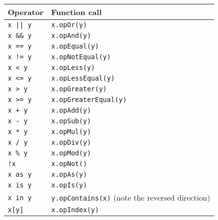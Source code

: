 \begin{longtable}{ | l | X | }
\hline
\textbf{Operator} & \textbf{Function call} \\
\hline\hline
\texttt{x || y} & \texttt{x.opOr(y)} \\
\hline
\texttt{x \&\& y} & \texttt{x.opAnd(y)} \\
\hline
\texttt{x == y} & \texttt{x.opEqual(y)} \\
\hline
\texttt{x != y} & \texttt{x.opNotEqual(y)} \\
\hline
\texttt{x < y} & \texttt{x.opLess(y)} \\
\hline
\texttt{x <= y} & \texttt{x.opLessEqual(y)} \\
\hline
\texttt{x > y} & \texttt{x.opGreater(y)} \\
\hline
\texttt{x >= y} & \texttt{x.opGreaterEqual(y)} \\
\hline
\texttt{x + y} & \texttt{x.opAdd(y)} \\
\hline
\texttt{x - y} & \texttt{x.opSub(y)} \\
\hline
\texttt{x * y} & \texttt{x.opMul(y)} \\
\hline
\texttt{x / y} & \texttt{x.opDiv(y)} \\
\hline
\texttt{x \% y} & \texttt{x.opMod(y)} \\
\hline
\texttt{!x} & \texttt{x.opNot()} \\
\hline
\texttt{x as y} & \texttt{x.opAs(y)} \\
\hline
\texttt{x is y} & \texttt{x.opIs(y)} \\
\hline
\texttt{x in y} & \texttt{y.opContains(x)} (note the reversed direction) \\
\hline
\texttt{x[y]} & \texttt{x.opIndex(y)} \\
\hline
\end{longtable}
